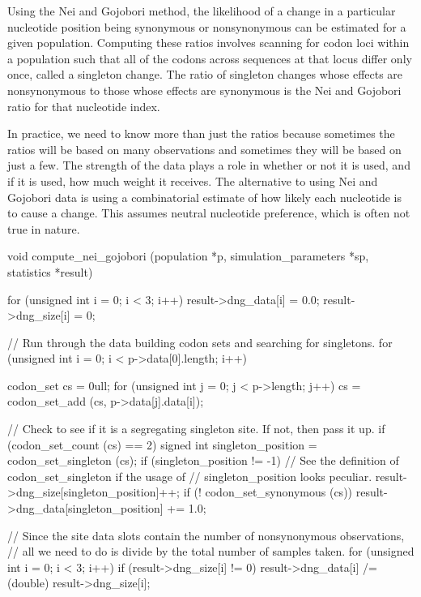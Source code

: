 \documentclass{article}
\begin{document}
      Using the Nei and Gojobori method, the likelihood of a change in a
      particular nucleotide position being synonymous or nonsynonymous can be
      estimated for a given population. Computing these ratios involves scanning
      for codon loci within a population such that all of the codons across
      sequences at that locus differ only once, called a singleton change. The
      ratio of singleton changes whose effects are nonsynonymous to those whose
      effects are synonymous is the Nei and Gojobori ratio for that nucleotide
      index.

      In practice, we need to know more than just the ratios because sometimes
      the ratios will be based on many observations and sometimes they will be
      based on just a few. The strength of the data plays a role in whether or
      not it is used, and if it is used, how much weight it receives. The
      alternative to using Nei and Gojobori data is using a combinatorial
      estimate of how likely each nucleotide is to cause a change. This assumes
      neutral nucleotide preference, which is often not true in nature.

\begin{ccode}
void compute_nei_gojobori (population *p, simulation_parameters *sp, statistics *result) {
  for (unsigned int i = 0; i < 3; i++) {
    result->dng_data[i] = 0.0;
    result->dng_size[i] = 0;
  }

  // Run through the data building codon sets and searching for singletons.
  for (unsigned int i = 0; i < p->data[0].length; i++) {
    codon_set cs = 0ull;
    for (unsigned int j = 0; j < p->length; j++)
      cs = codon_set_add (cs, p->data[j].data[i]);

    // Check to see if it is a segregating singleton site. If not, then pass it up.
    if (codon_set_count (cs) == 2) {
      signed int singleton_position = codon_set_singleton (cs);
      if (singleton_position != -1) {
        // See the definition of codon_set_singleton if the usage of
        // singleton_position looks peculiar.
        result->dng_size[singleton_position]++;
        if (! codon_set_synonymous (cs))
         result->dng_data[singleton_position] += 1.0;
      }
    }
  }

  // Since the site data slots contain the number of nonsynonymous observations,
  // all we need to do is divide by the total number of samples taken.
  for (unsigned int i = 0; i < 3; i++)
    if (result->dng_size[i] != 0)
      result->dng_data[i] /= (double) result->dng_size[i];
}
\end{ccode}
\end{document}
